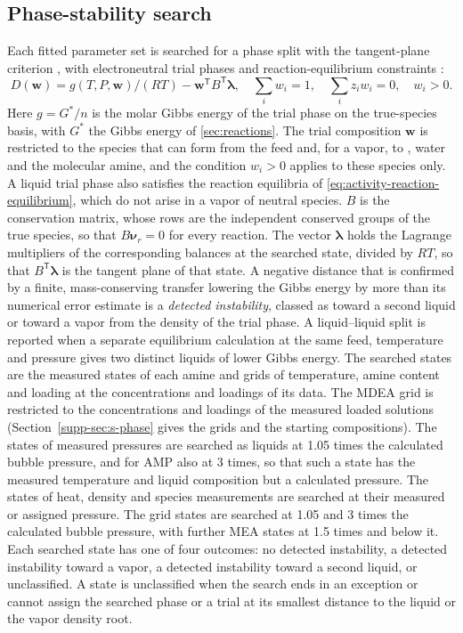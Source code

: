 \subsection{Phase-stability search}\label{sec:methods-phase}
Each fitted parameter set is searched for a phase split with the tangent-plane criterion \cite{Michelsen1982}, with electroneutral trial phases \cite{Perdomo2025} and reaction-equilibrium constraints \cite{Tsanas2022,Ascani2022}:
\begin{equation}
 D(\boldsymbol w)=g(T,P,\boldsymbol w)/(RT)-\boldsymbol w^{\mathsf T}B^{\mathsf T}\boldsymbol\lambda,
 \quad \sum_iw_i=1,\quad\sum_i z_iw_i=0,\quad w_i>0.
 \label{eq:tpd}
\end{equation}
Here $g=G^*/n$ is the molar Gibbs energy of the trial phase on the true-species basis, with $G^*$ the Gibbs energy of \cref{sec:reactions}.
The trial composition $\boldsymbol w$ is restricted to the species that can form from the feed and, for a vapor, to \COtwo, water and the molecular amine, and the condition $w_i>0$ applies to these species only.
A liquid trial phase also satisfies the reaction equilibria of \cref{eq:activity-reaction-equilibrium}, which do not arise in a vapor of neutral species.
$B$ is the conservation matrix, whose rows are the independent conserved groups of the true species, so that $B\boldsymbol\nu_r=0$ for every reaction.
The vector $\boldsymbol\lambda$ holds the Lagrange multipliers of the corresponding balances at the searched state, divided by $RT$, so that $B^{\mathsf T}\boldsymbol\lambda$ is the tangent plane of that state.
A negative distance that is confirmed by a finite, mass-conserving transfer lowering the Gibbs energy by more than its numerical error estimate is a \emph{detected instability}, classed as toward a second liquid or toward a vapor from the density of the trial phase.
A liquid--liquid split is reported when a separate equilibrium calculation at the same feed, temperature and pressure gives two distinct liquids of lower Gibbs energy.
The searched states are the measured states of each amine and grids of temperature, amine content and loading at the concentrations and loadings of its data.
The MDEA grid is restricted to the concentrations and loadings of the measured loaded solutions (Section~\ref{supp-sec:s-phase} gives the grids and the starting compositions).
The states of measured pressures are searched as liquids at 1.05 times the calculated bubble pressure, and for AMP also at 3 times, so that such a state has the measured temperature and liquid composition but a calculated pressure.
The states of heat, density and species measurements are searched at their measured or assigned pressure.
The grid states are searched at 1.05 and 3 times the calculated bubble pressure, with further MEA states at 1.5 times and below it.
Each searched state has one of four outcomes: no detected instability, a detected instability toward a vapor, a detected instability toward a second liquid, or unclassified.
A state is unclassified when the search ends in an exception or cannot assign the searched phase or a trial at its smallest distance to the liquid or the vapor density root.

